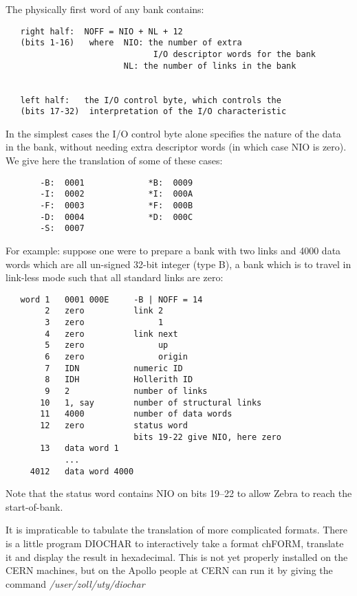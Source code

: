The physically first word of any bank contains:

\begin{verbatim}
   right half:  NOFF = NIO + NL + 12
   (bits 1-16)   where  NIO: the number of extra
                              I/O descriptor words for the bank
                        NL: the number of links in the bank


   left half:   the I/O control byte, which controls the
   (bits 17-32)  interpretation of the I/O characteristic
\end{verbatim} 

In the simplest cases the I/O control byte alone specifies
the nature of the data in the bank, without needing extra
descriptor words (in which case NIO is zero).
We give here the translation of some of these cases:

\begin{verbatim}
       -B:  0001             *B:  0009
       -I:  0002             *I:  000A
       -F:  0003             *F:  000B
       -D:  0004             *D:  000C
       -S:  0007
\end{verbatim} 

For example: suppose one were to prepare a bank with
two links and 4000 data words which are all un-signed
32-bit integer (type B), a bank which is to travel
in link-less mode such that all standard links are zero:

\begin{verbatim}
   word 1   0001 000E     -B | NOFF = 14
        2   zero          link 2
        3   zero               1
        4   zero          link next
        5   zero               up
        6   zero               origin
        7   IDN           numeric ID
        8   IDH           Hollerith ID
        9   2             number of links
       10   1, say        number of structural links
       11   4000          number of data words
       12   zero          status word
                          bits 19-22 give NIO, here zero
       13   data word 1
            ...
     4012   data word 4000
\end{verbatim} 

Note that the status word contains NIO on bits 19--22
to allow Zebra to reach the start-of-bank.

It is impraticable to tabulate the translation of more
complicated formats. There is a little program DIOCHAR
to interactively take a format chFORM, translate it
and display the result in hexadecimal.
This is not yet properly installed on the CERN machines,
but on the Apollo people at CERN can run it by giving
the command {\em  /user/zoll/uty/diochar}

